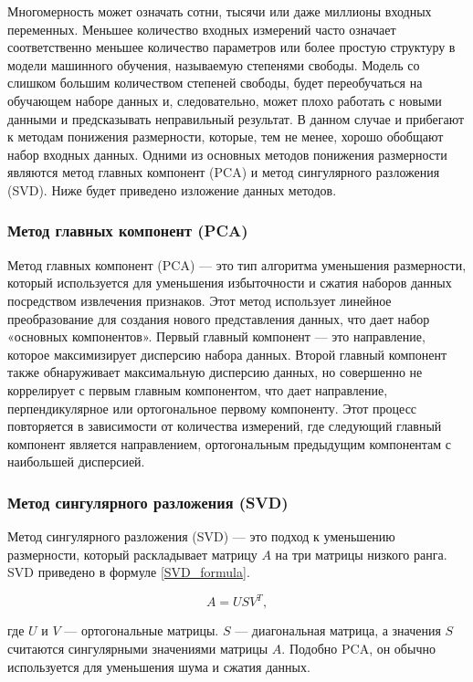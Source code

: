 Многомерность может означать сотни, тысячи или даже миллионы входных переменных. Меньшее количество входных измерений часто означает соответственно меньшее количество параметров или более простую структуру в модели машинного обучения, называемую степенями свободы. Модель со слишком большим количеством степеней свободы, будет переобучаться на обучающем наборе данных и, следовательно, может плохо работать с новыми данными и предсказывать неправильный результат. В данном случае и прибегают к методам понижения размерности, которые, тем не менее, хорошо обобщают набор входных данных. Одними из основных методов понижения размерности являются метод главных компонент (PCA) и метод сингулярного разложения (SVD). Ниже будет приведено изложение данных методов.

\subsubsection{Метод главных компонент (PCA)}

Метод главных компонент (PCA) --- это тип алгоритма уменьшения размерности, который используется для уменьшения избыточности и сжатия наборов данных посредством извлечения признаков. Этот метод использует линейное преобразование для создания нового представления данных, что дает набор «основных компонентов». Первый главный компонент --- это направление, которое максимизирует дисперсию набора данных. Второй главный компонент также обнаруживает максимальную дисперсию данных, но совершенно не коррелирует с первым главным компонентом, что дает направление, перпендикулярное или ортогональное первому компоненту. Этот процесс повторяется в зависимости от количества измерений, где следующий главный компонент является направлением, ортогональным предыдущим компонентам с наибольшей дисперсией.

\subsubsection{Метод сингулярного разложения (SVD)}

Метод сингулярного разложения (SVD) --- это подход к уменьшению размерности, который раскладывает матрицу $A$ на три матрицы низкого ранга. SVD приведено в формуле \ref{SVD_formula}.

\begin{equation}
\label{SVD_formula}
A = USV^T,
\end{equation}

где $U$ и $V$ --- ортогональные матрицы. $S$ --- диагональная матрица, а значения $S$ считаются сингулярными значениями матрицы $A$. Подобно PCA, он обычно используется для уменьшения шума и сжатия данных.

